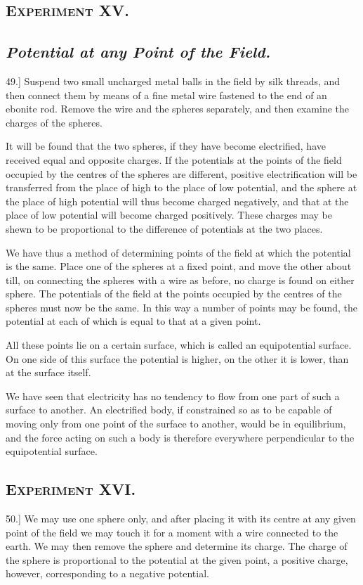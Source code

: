 \documentclass[12pt,oneside]{book}[2021/10/04]
\newcommand{\Heading}{\centering\normalfont}
\newcommand{\Section}[1]{\subsection*{\normalsize\Heading\scshape #1}}
\newcommand{\Subsection}[1]{\subsection*{\normalsize\Heading\itshape #1}}
\newcommand{\Runhead}[1]{\fancyhead[C]{\iffloatpage{}{\small#1}}}
\newcommand{\article}[1]{\phantomsection \label{art:#1}{#1.]}}
\newcommand{\¬}{\hphantom{0}}
\begin{document}
\Section{Experiment XV.}

\Subsection{Potential at any Point of the Field.}

\article{49} Suspend two small uncharged metal balls in the field by
silk threads, and then connect them by means of a fine metal wire
fastened to the end of an ebonite rod. Remove the wire and the
spheres separately, and then examine the charges of the spheres.

It will be found that the two spheres, if they have become
electrified, have received equal and opposite charges. If the potentials
at the points of the field occupied by the centres of the spheres
are different, positive electrification will be transferred from the
place of high to the place of low potential, and the sphere at the
place of high potential will thus become charged negatively, and
that at the place of low potential will become charged positively.
These charges may be shewn to be proportional to the difference of
potentials at the two places.

We have thus a method of determining points of the field at
which the potential is the same. Place one of the spheres at
a fixed point, and move the other about till, on connecting the
spheres with a wire as before, no charge is found on either sphere.
The potentials of the field at the points occupied by the centres of
the spheres must now be the same. In this way a number of
points may be found, the potential at each of which is equal to that
at a given point.

All these points lie on a certain surface, which is called an equipotential
surface. On one side of this surface the potential is
higher, on the other it is lower, than at the surface itself.

We have seen that electricity has no tendency to flow from one
part of such a surface to another. An electrified body, if constrained
so as to be capable of moving only from one point of the
surface to another, would be in equilibrium, and the force acting on
such a body is therefore everywhere perpendicular to the equipotential
surface.

\Section{Experiment XVI.}

\article{50} We may use one sphere only, and after placing it with its
centre at any given point of the field we may touch it for a moment
with a wire connected to the earth. We may then remove the
sphere and determine its charge. The charge of the sphere is proportional
to the potential at the given point, a positive charge,
however, corresponding to a negative potential.
\Runhead{POTENTIAL DETERMINED BY ONE SPHERE.}
\end{document}

